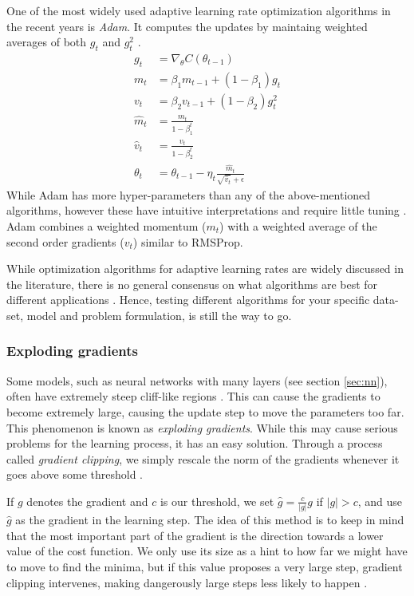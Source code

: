 One of the most widely used adaptive learning rate optimization algorithms in the recent years is \textit{Adam}.
It computes the updates by maintaing weighted averages of both $g_t$ and $g_t^2$ \citep[p. 123]{Ketkar2017}.
\begin{equation}\label{eq:updt_adam}
\begin{split}
    g_t &= \nabla_{\theta}C(\theta_{t-1})   \\
    m_t &= \beta_1m_{t-1} + (1-\beta_1)g_t \\
    v_t &= \beta_2v_{t-1} + (1-\beta_2)g_t^2 \\
    \hat{m}_t &= \frac{m_t}{1-\beta_1^t} \\
    \hat{v}_t &= \frac{v_t}{1-\beta_2^t} \\
    \theta_{t} &= \theta_{t-1} - \eta_t \frac{\hat{m}_t}{\sqrt{\hat{v}_t}+\epsilon}
\end{split}
\end{equation}
While Adam has more hyper-parameters than any of the above-mentioned algorithms, however these have intuitive interpretations and require little tuning \cite{kingba}.
Adam combines a weighted momentum ($m_t$) with a weighted average of the second order gradients ($v_t$) similar to RMSProp.

While optimization algorithms for adaptive learning rates are widely discussed in the literature, there is no general consensus on what algorithms are best for different applications \cite{schaul2014}.
Hence, testing different algorithms for your specific data-set, model and problem formulation, is still the way to go.

\subsubsection{Exploding gradients}\label{sec:exploding_gradients}
Some models, such as neural networks with many layers (see section \ref{sec:nn}), often have extremely steep cliff-like regions \citep[p. 285]{Goodfellow-et-al-2016}.
This can cause the gradients to become extremely large, causing the update step to move the parameters too far.
This phenomenon is known as \textit{exploding gradients}.
While this may cause serious problems for the learning process, it has an easy solution.
Through a process called \textit{gradient clipping}, we simply rescale the norm of the gradients whenever it goes above some threshold \citep[p. 93]{Ketkar2017}.

If $g$ denotes the gradient and $c$ is our threshold, we set $\hat{g} = \frac{c}{|g|}g$ if $|g|>c$, and use $\hat{g}$ as the gradient in the learning step.
The idea of this method is to keep in mind that the most important part of the gradient is the direction towards a lower value of the cost function.
We only use its size as a hint to how far we might have to move to find the minima, but if this value proposes a very large step, gradient clipping intervenes, making dangerously large steps less likely to happen \citep[p. 286]{Goodfellow-et-al-2016}.

